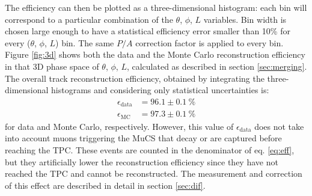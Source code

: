 \documentclass[a4paper,11pt]{article}
\begin{document}
The efficiency can then be plotted as a three-dimensional histogram: each bin will correspond to a particular combination of the $\theta$, $\phi$, $L$ variables. Bin width is chosen large enough to have a statistical efficiency error smaller than 10\% for every ($\theta$, $\phi$, $L$) bin. The same $P/A$ correction factor is applied to every bin. Figure \ref{fig:3d} shows both the data and the Monte Carlo reconstruction efficiency in that 3D phase space of $\theta$, $\phi$, $L$, calculated as described in section \ref{sec:merging}. The overall track reconstruction efficiency, obtained by integrating the three-dimensional histograms and considering only statistical uncertainties is:
\begin{align*}
\epsilon_{\mathrm{data}} &= 96.1 \pm 0.1~\%\\
\epsilon_{\mathrm{MC}} &= 97.3 \pm 0.1~\%
\end{align*} for data and Monte Carlo, respectively. However, this value of $\epsilon_{\mathrm{data}}$ does not take into account muons triggering the MuCS that decay or are captured before reaching the TPC. These events are counted in the denominator of eq. \eqref{eq:eff}, but they artificially lower the reconstruction efficiency since they have not reached the TPC and cannot be reconstructed. The measurement and correction of this effect are described in detail in section \ref{sec:dif}.
\end{document}
